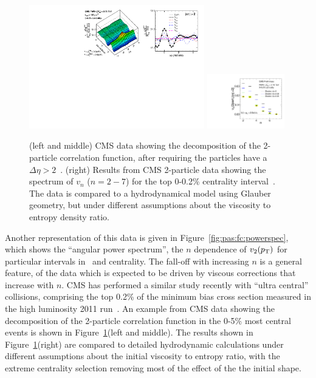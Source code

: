 \begin{figure}[!tb]
\begin{center}
\includegraphics[width=0.68\textwidth]{flowcorrelations_figs/corr1Dfit_UCC_centmin110_centmax1000_20131119.pdf}
\includegraphics[width=0.3\textwidth]{flowcorrelations_figs/compare_vnn_hydro_luzum_20120810.pdf}
\caption[]{
(left and middle) CMS data showing the decomposition of the 2-particle correlation function,
after requiring the particles have a $\Delta\eta>2$~\cite{CMS:2013bza}.
(right) Results from CMS 2-particle data showing the spectrum of $v_n$ ($n=2-7$)
for the top 0-0.2\% centrality interval~\cite{CMS:2013bza}.
The data is compared to a hydrodynamical model using Glauber geometry, but
under different assumptions about the viscosity to entropy density ratio.
}
\label{fig:pas:fc:ucc}
\end{center}
\end{figure}

Another representation of this data is given in Figure~\ref{fig:pas:fc:powerspec}, which shows the ``angular power spectrum'',
the $n$ dependence of $v_2(\mbox{$p_{\mathrm{T}}$})$ for particular intervals in \pT\ and centrality.  The fall-off with increasing $n$ is a general
feature, of the data which is expected to be driven by viscous corrections that increase with $n$.
CMS has performed a similar study recently with ``ultra central'' collisions, comprising
the top 0.2\% of the minimum bias cross section measured in the high
luminosity 2011 run~\cite{CMS:2013bza}.
An example from CMS data showing the
decomposition of the 2-particle correlation function in the 0-5\% most central
events is shown in Figure~\ref{fig:pas:fc:ucc}(left and middle).
The results shown in Figure~\ref{fig:pas:fc:ucc}(right)
are compared to detailed hydrodynamic calculations under
different assumptions about the initial viscosity to entropy ratio, with
the extreme centrality selection removing most of the effect of the
the initial shape.

